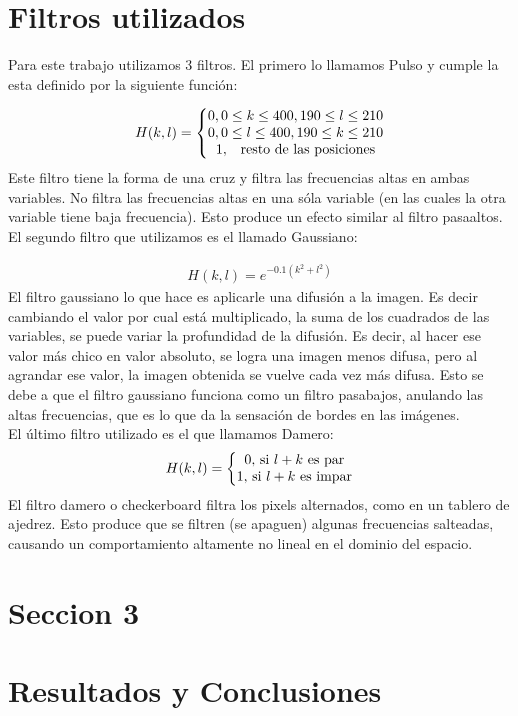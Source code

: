 \documentclass[11pt,a4paper]{emulateapj}
\begin{document}
\section{Filtros utilizados}
\label{sec:sec2}
Para este trabajo utilizamos 3 filtros. El primero lo llamamos Pulso y cumple la esta definido por la siguiente función:

\begin{eqnarray}
H(k,l) = \left\{
	\begin{matrix}
		0, 0 \leq k \leq 400, 190 \leq l \leq 210 \\
		0, 0 \leq l \leq 400, 190 \leq k \leq 210 \\
		1, \quad $resto de las posiciones$
	\end{matrix} 
	\right.
\end{eqnarray}
Este filtro tiene la forma de una cruz y filtra las frecuencias altas en ambas variables. No filtra las frecuencias altas en
una sóla variable (en las cuales la otra variable tiene baja frecuencia). Esto produce un efecto similar al filtro
pasaaltos.\\
El segundo filtro que utilizamos es el llamado Gaussiano:

\begin{eqnarray}
H(k,l) = e^{-0.1(k^2 + l^2)}
\end{eqnarray}
El filtro gaussiano lo que hace es aplicarle una difusión a la imagen. Es decir cambiando el valor por cual está multiplicado, la suma de los cuadrados de las variables, se puede variar la profundidad de la difusión. Es decir, al hacer ese valor más chico en valor absoluto, se logra una imagen menos difusa, pero al agrandar ese valor, la imagen obtenida se vuelve cada vez más difusa. Esto se debe a que el filtro gaussiano funciona como un filtro pasabajos, anulando las altas frecuencias, que es lo que da la sensación de bordes en las imágenes.
\\
El último filtro utilizado es el que llamamos Damero:
\begin{eqnarray}
H(k,l) = \left\{
	\begin{matrix}
		0,$ si $l+k$ es par$\\
		1,$ si $l+k$ es impar$\\
	\end{matrix} 
	\right.
\end{eqnarray}
El filtro damero o checkerboard filtra los pixels alternados, como en un tablero de ajedrez. Esto produce que se 
filtren (se apaguen) algunas frecuencias salteadas, causando un comportamiento altamente no lineal en el dominio
del espacio.


\section{Seccion 3}
\label{sec:sec3}




\section{Resultados y Conclusiones}
\label{sec:resultadosyconclusiones}

%

\end{document}
